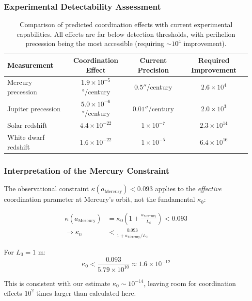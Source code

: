 \documentclass[11pt,a4paper]{article}
\begin{document}
\subsubsection{Experimental Detectability Assessment}

\begin{table}[htbp]
	\centering
	\begin{tabular}{lccc}
		\toprule
		\textbf{Measurement} & \textbf{Coordination Effect} & \textbf{Current Precision} & \textbf{Required Improvement} \\
		\midrule
		Mercury precession & $1.9 \times 10^{-5}$''/century & $0.5''$/century & $2.6 \times 10^4$ \\
		Jupiter precession & $5.0 \times 10^{-6}$''/century & $0.01''$/century & $2.0 \times 10^3$ \\
		Solar redshift & $4.4 \times 10^{-22}$ & $1 \times 10^{-7}$ & $2.3 \times 10^{14}$ \\
		White dwarf redshift & $1.6 \times 10^{-22}$ & $1 \times 10^{-5}$ & $6.4 \times 10^{16}$ \\
		\bottomrule
	\end{tabular}
	\caption{Comparison of predicted coordination effects with current experimental capabilities. 
		All effects are far below detection thresholds, with perihelion precession being the 
		most accessible (requiring $\sim 10^4$ improvement).}
\end{table}

\subsubsection{Interpretation of the Mercury Constraint}

The observational constraint $\kappa(a_{\text{Mercury}}) < 0.093$ applies to the 
\textit{effective} coordination parameter at Mercury's orbit, not the fundamental $\kappa_0$:

\begin{align}
	\kappa(a_{\text{Mercury}}) &= \kappa_0 \left(1 + \frac{a_{\text{Mercury}}}{L_0}\right) < 0.093 \\
	\Rightarrow \kappa_0 &< \frac{0.093}{1 + a_{\text{Mercury}}/L_0}
\end{align}

For $L_0 = 1$ m:
\begin{equation}
	\kappa_0 < \frac{0.093}{5.79 \times 10^{10}} \approx 1.6 \times 10^{-12}
\end{equation}

This is consistent with our estimate $\kappa_0 \sim 10^{-14}$, leaving room for 
coordination effects $10^2$ times larger than calculated here.
\end{document}
